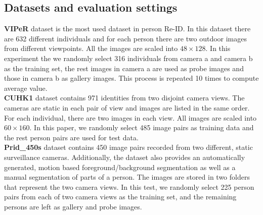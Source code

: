 \documentclass[conference,compsoc]{IEEEtran}
\begin{document}
\subsection{Datasets and evaluation settings}
\noindent \textbf{VIPeR} dataset is the most used dataset in person Re-ID. In this dataset there are 632 different individuals and for each person there are two outdoor images from different viewpoints. All the images are scaled into $48\times128$. In this experiment the we randomly select 316 individuals from camera a and camera b as the training set, the rest images in camera a are used as probe images and those in camera b as gallery images. This process is repeated 10 times to compute average value.\\
\textbf{CUHK1} dataset contains 971 identities from two disjoint camera views. The cameras are static in each pair of view and images are listed in the same order. For each individual, there are two images in each view. All images are scaled into $60\times160$. In this paper, we randomly select 485 image pairs as training data and the rest person pairs are used for test data. \\
\textbf{Prid\_450s} dataset contains 450 image pairs recorded from two different, static surveillance cameras. Additionally, the dataset also provides an automatically generated, motion based foreground/background segmentation as well as a manual segmentation of parts of a person. The images are stored in two folders that represent the two camera views. In this test, we randomly select 225 person pairs from each of two camera views as the training set, and the remaining persons are left as gallery and probe images. \\
\end{document}
